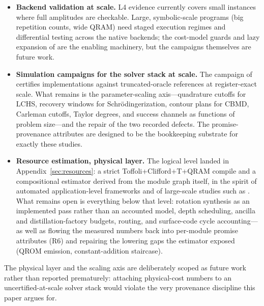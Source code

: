 \begin{itemize}
\item \textbf{Backend validation at scale.}  L4 evidence currently covers
  small instances where full amplitudes are checkable.  Large, symbolic-scale
  programs (big repetition counts, wide QRAM) need staged execution regimes
  and differential testing across the native backends; the cost-model guards
  and lazy expansion of  are the enabling machinery, but the
  campaigns themselves are future work.
\item \textbf{Simulation campaigns for the solver stack at scale.}  The
  campaign of  certifies implementations against
  truncated-oracle references at register-exact scale.  What remains is the
  parameter-scaling axis---quadrature cutoffs for LCHS, recovery windows
  for Schr\"odingerization, contour plans for CBMD, Carleman cutoffs,
  Taylor degrees, and success channels as functions of problem size---and
  the repair of the two recorded defects.  The promise-provenance
  attributes are designed to be the bookkeeping substrate for exactly these
  studies.
\item \textbf{Resource estimation, physical layer.}  The logical level
  landed in Appendix~\ref{sec:resources}: a strict Toffoli+Clifford+T+QRAM
  compile and a compositional estimator derived from the module graph
  itself, in the spirit of automated application-level frameworks
  \cite{beverland2022assessing,harrigan2024qualtran,su2026resource} and of
  large-scale studies such as \cite{gidney2021factor,gidney2025rsa}.  What
  remains open is everything below that level: rotation synthesis as an
  implemented pass rather than an accounted model, depth scheduling,
  ancilla and distillation-factory budgets, routing, and surface-code cycle
  accounting---as well as flowing the measured numbers back into per-module
  promise attributes (R6) and repairing the lowering gaps the estimator
  exposed (QROM emission, constant-addition staircase).
\end{itemize}

\noindent The physical layer and the scaling axis are deliberately scoped
as future work rather than reported prematurely: attaching physical-cost
numbers to an uncertified-at-scale solver stack would violate the very
provenance discipline this paper argues for.
